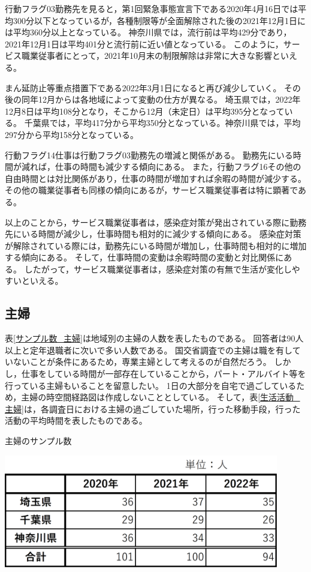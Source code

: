 \documentclass[paper={210mm,297mm},fontsize=15Q,line_length=35zw,number_of_lines=31,head_space=30mm,gutter=40mm,baselineskip=2.0zw,headfoot_verticalposition=1.5zw]{jlreq}
\begin{document}
行動フラグ03勤務先を見ると，第1回緊急事態宣言下である2020年4月16日では平均300分以下となっているが，各種制限等が全面解除された後の2021年12月1日には平均360分以上となっている。
神奈川県では，流行前は平均429分であり，2021年12月1日は平均401分と流行前に近い値となっている。
このように，サービス職業従事者にとって，2021年10月末の制限解除は非常に大きな影響といえる。

まん延防止等重点措置下である2022年3月1日になると再び減少していく。
その後の同年12月からは各地域によって変動の仕方が異なる。
埼玉県では，2022年12月8日は平均108分となり，そこから12月（未定日）は平均395分となっている。
千葉県では，平均417分から平均350分となっている。神奈川県では，平均297分から平均158分となっている。

行動フラグ14仕事は行動フラグ03勤務先の増減と関係がある。
勤務先にいる時間が減れば，仕事の時間も減少する傾向にある。
また，行動フラグ16その他の自由時間とは対比関係があり，仕事の時間が増加すれば余暇の時間が減少する。
その他の職業従事者も同様の傾向にあるが，サービス職業従事者は特に顕著である。

以上のことから，サービス職業従事者は，感染症対策が発出されている際に勤務先にいる時間が減少し，仕事時間も相対的に減少する傾向にある。
感染症対策が解除されている際には，勤務先にいる時間が増加し，仕事時間も相対的に増加する傾向にある。
そして，仕事時間の変動は余暇時間の変動と対比関係にある。
したがって，サービス職業従事者は，感染症対策の有無で生活が変化しやすいといえる。

\newpage

\subsection{主婦}

表\ref{サンプル数_主婦}は地域別の主婦の人数を表したものである。
回答者は90人以上と定年退職者に次いで多い人数である。
国交省調査での主婦は職を有していないことが条件にあるため，専業主婦として考えるのが自然だろう。
しかし，仕事をしている時間が一部存在していることから，パート・アルバイト等を行っている主婦もいることを留意したい。
1日の大部分を自宅で過ごしているため，主婦の時空間経路図は作成しないこととしている。
そして，表\ref{生活活動_主婦}は，各調査日における主婦の過ごしていた場所，行った移動手段，行った活動の平均時間を表したものである。

\begin{table}[H]
  \centering
  \caption{主婦のサンプル数}
  \includegraphics[width=120mm]{../Figure/c04s05_table_主婦_サンプル数.png}
  \label{サンプル数_主婦}
\end{table}
\end{document}

